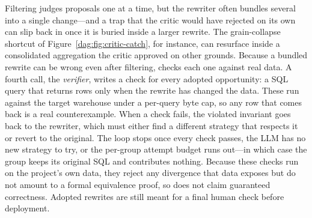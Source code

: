 Filtering judges proposals one at a time, but the rewriter often bundles several into a single change—and a trap that the critic would have rejected on its own can slip back in once it is buried inside a larger rewrite. The grain-collapse shortcut of Figure~\ref{dag:fig:critic-catch}, for instance, can resurface inside a consolidated aggregation the critic approved on other grounds. 
Because a bundled rewrite can be wrong even after filtering, \dagsmith{} checks each one against real data. A fourth call, the \emph{verifier}, writes a check for every adopted opportunity: a SQL query that returns rows only when the rewrite has changed the data. These run against the target warehouse under a per-query byte cap, so any row that comes back is a real counterexample. When a check fails, the violated invariant goes back to the rewriter, which must either find a different strategy that respects it or revert to the original. The loop stops once every check passes, the LLM has no new strategy to try, or the per-group attempt budget runs out—in which case the group keeps its original SQL and contributes nothing. Because these checks run on the project's own data, they reject any divergence that data exposes but do not amount to a formal equivalence proof, so \dagsmith{} does not claim guaranteed correctness. Adopted rewrites are still meant for a final human check before deployment.

